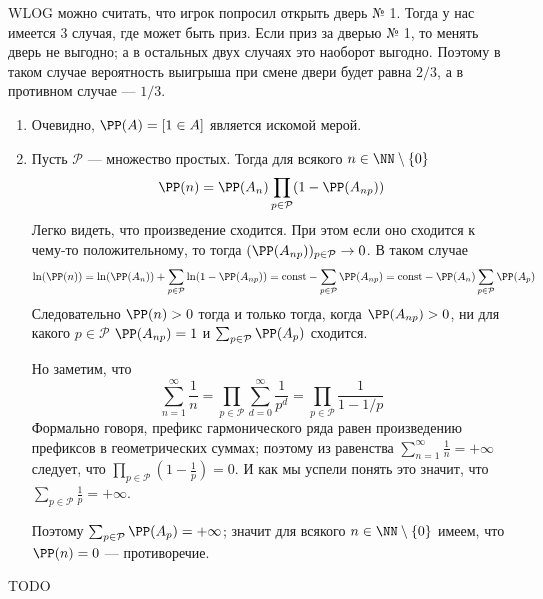 \documentclass[12pt,a4paper]{article}
\newcommand{\const}{\ensuremath{\mathrm{const}}\xspace}
\begin{document}
    \begin{problem}{25}
        WLOG можно считать, что игрок попросил открыть дверь № 1. Тогда у нас имеется 3 случая, где может быть приз. Если приз за дверью № 1, то менять дверь не выгодно; а в остальных двух случаях это наоборот выгодно. Поэтому в таком случае вероятность выигрыша при смене двери будет равна $2/3$, а в противном случае --- $1/3$.
    \end{problem}

    \begin{problem}{31}
        \begin{enumerate}
            \item Очевидно, $\PP(A) = [1 \in A]$ является искомой мерой.
            \item Пусть $\mathcal{P}$ --- множество простых. Тогда для всякого $n \in \NN \setminus \{0\}$
                \[\PP(n) = \PP(A_n) \prod_{p \in \mathcal{P}} (1 - \PP(A_{np}))\]
                Легко видеть, что произведение сходится. При этом если оно сходится к чему-то положительному, то тогда $(\PP(A_{np}))_{p \in \mathcal{P}} \to 0$. В таком случае
                \[
                    \ln(\PP(n))
                    = \ln(\PP(A_n)) + \sum_{p \in \mathcal{P}} \ln(1 - \PP(A_{np}))
                    = \const - \sum_{p \in \mathcal{P}} \PP(A_{np})
                    = \const - \PP(A_n) \sum_{p \in \mathcal{P}} \PP(A_p)
                \]
                Следовательно $\PP(n) > 0$ тогда и только тогда, когда $\PP(A_{np}) > 0$, ни для какого $p \in \mathcal{P}$ $\PP(A_{np}) = 1$ и $\sum_{p \in \mathcal{P}} \PP(A_p)$ сходится.

                Но заметим, что
                \[
                    \sum_{n=1}^\infty \frac{1}{n}
                    = \prod_{p \in \mathcal{P}} \sum_{d=0}^\infty \frac{1}{p^d}
                    = \prod_{p \in \mathcal{P}} \frac{1}{1 - 1/p}
                \]
                Формально говоря, префикс гармонического ряда равен произведению префиксов в геометрических суммах; поэтому из равенства $\sum_{n=1}^\infty \frac{1}{n} = +\infty$ следует, что $\prod_{p \in \mathcal{P}} (1 - \frac{1}{p}) = 0$. И как мы успели понять это значит, что $\sum_{p \in \mathcal{P}} \frac{1}{p} = +\infty$.
                
                Поэтому $\sum_{p \in \mathcal{P}} \PP(A_p) = +\infty$; значит для всякого $n \in \NN \setminus \{0\}$ имеем, что $\PP(n) = 0$ --- противоречие.
        \end{enumerate}
    \end{problem}

    \begin{problem}{14}
        TODO
    \end{problem}
\end{document}
